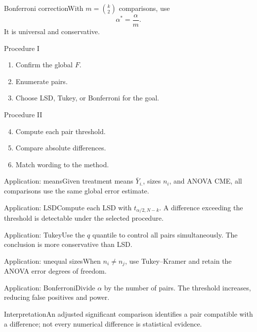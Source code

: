\documentclass[10pt,aspectratio=169]{beamer}
\begin{document}
\begin{frame}{Bonferroni correction}\small With $m=\binom{k}{2}$ comparisons, use\[\alpha^*=\frac{\alpha}{m}.\]It is universal and conservative.\end{frame}
\begin{frame}{Procedure I}\small\begin{enumerate}\item Confirm the global $F$.\item Enumerate pairs.\item Choose LSD, Tukey, or Bonferroni for the goal.\end{enumerate}\end{frame}
\begin{frame}{Procedure II}\small\begin{enumerate}\setcounter{enumi}{3}\item Compute each pair threshold.\item Compare absolute differences.\item Match wording to the method.\end{enumerate}\end{frame}
\begin{frame}{Application: means}\small Given treatment means $\bar Y_{i.}$, sizes $n_i$, and ANOVA CME, all comparisons use the same global error estimate.\end{frame}
\begin{frame}{Application: LSD}\small Compute each LSD with $t_{\alpha/2,N-k}$. A difference exceeding the threshold is detectable under the selected procedure.\end{frame}
\begin{frame}{Application: Tukey}\small Use the $q$ quantile to control all pairs simultaneously. The conclusion is more conservative than LSD.\end{frame}
\begin{frame}{Application: unequal sizes}\small When $n_i\neq n_j$, use Tukey--Kramer and retain the ANOVA error degrees of freedom.\end{frame}
\begin{frame}{Application: Bonferroni}\small Divide $\alpha$ by the number of pairs. The threshold increases, reducing false positives and power.\end{frame}
\begin{frame}{Interpretation}\small An adjusted significant comparison identifies a pair compatible with a difference; not every numerical difference is statistical evidence.\end{frame}
\end{document}

